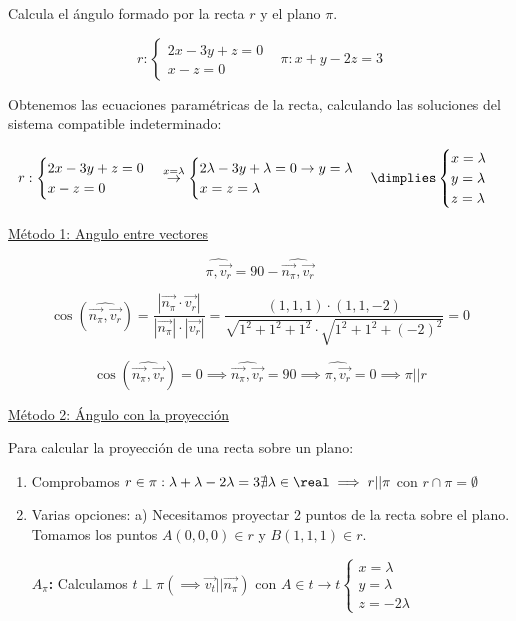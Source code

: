\begin{problem}

Calcula el ángulo formado por la recta $r$ y el plano $\pi$.

\[
r : \begin{cases} 2x-3y+z=0\\x-z=0\end{cases}\;\;\;\pi: x+y-2z=3
\]
\solution

Obtenemos las ecuaciones paramétricas de la recta, calculando las soluciones del sistema compatible indeterminado:

\[
r : \begin{cases} 2x-3y+z=0\\x-z=0\end{cases} \overset{x=\lambda}{\to}
\begin{cases} 2\lambda-3y+\lambda = 0 \to y=\lambda \\x=z=\lambda\end{cases} \dimplies \begin{cases}x=\lambda\\y=\lambda\\z=\lambda\end{cases}
\]

\ul{Método 1: Angulo entre vectores}

\[
\widehat{\pi,\vec{v_r}} = 90 - \widehat{\vec{n_{\pi}},\vec{v_r}}
\]

\[
\cos\left(\widehat{\vec{n_{\pi}},\vec{v_r}}\right) = \frac{|\vec{n_{\pi}}·\vec{v_r}|}{|\vec{n_{\pi}}|·|\vec{v_r}|} = \frac{(1,1,1)·(1,1,-2)}{\sqrt{1^2+1^2+1^2}·\sqrt{1^2+1^2+(-2)^2}} = 0 
\]

\[
\cos\left(\widehat{\vec{n_{\pi}},\vec{v_r}}\right) = 0\implies \widehat{\vec{n_{\pi}},\vec{v_r}} = 90 \implies \widehat{\pi,\vec{v_r}} = 0 \implies \pi|| r
\]


\ul{Método 2: Ángulo con la proyección}

Para calcular la proyección de una recta sobre un plano:
\begin{enumerate}
  \item Comprobamos $r\in \pi: \lambda+\lambda-2\lambda = 3 \nexists\lambda\in\real\implies r||\pi$ con $r\cap\pi=\emptyset$ 
  
  \item Varias opciones:
  \subitem a) Necesitamos proyectar 2 puntos de la recta sobre el plano. Tomamos los puntos $A(0,0,0)\in r$ y $B(1,1,1)\in r$.

  \textbf{$A_{\pi}$:} Calculamos $t\perp\pi (\implies \vec{v_t}||\vec{n_{\pi}})$ con $A\in t\to t\begin{cases}x=\lambda\\y=\lambda\\z=-2\lambda\end{cases}$


\end{enumerate}
\end{problem}
